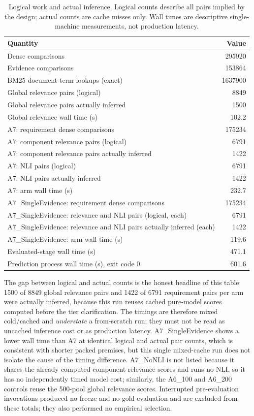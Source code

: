 \documentclass[11pt,a4paper]{article}
\begin{document}
\begin{table}[htbp]
\centering
\footnotesize
\caption{Logical work and actual inference. Logical counts describe all pairs implied by the design; actual counts are cache misses only. Wall times are descriptive single-machine measurements, not production latency.}
\label{tab:efficiency}
\begin{tabular}{@{}lr@{}}
\toprule
Quantity & Value \\
\midrule
Dense comparisons & 295920 \\
Evidence comparisons & 153864 \\
BM25 document-term lookups (exact) & 1637900 \\
Global relevance pairs (logical) & 8849 \\
Global relevance pairs actually inferred & 1500 \\
Global relevance wall time (s) & 102.2 \\
\midrule
A7: requirement dense comparisons & 175234 \\
A7: component relevance pairs (logical) & 6791 \\
A7: component relevance pairs actually inferred & 1422 \\
A7: NLI pairs (logical) & 6791 \\
A7: NLI pairs actually inferred & 1422 \\
A7: arm wall time (s) & 232.7 \\
\midrule
A7\_SingleEvidence: requirement dense comparisons & 175234 \\
A7\_SingleEvidence: relevance and NLI pairs (logical, each) & 6791 \\
A7\_SingleEvidence: relevance and NLI pairs actually inferred (each) & 1422 \\
A7\_SingleEvidence: arm wall time (s) & 119.6 \\
\midrule
Evaluated-stage wall time (s) & 471.1 \\
Prediction process wall time (s), exit code 0 & 601.6 \\
\bottomrule
\end{tabular}
\end{table}

The gap between logical and actual counts is the honest headline of this table: 1500 of 8849 global relevance pairs and 1422 of 6791 requirement pairs per arm were actually inferred, because this run reuses cached pure-model scores computed before the tier clarification. The timings are therefore mixed cold/cached and \emph{understate} a from-scratch run; they must not be read as uncached inference cost or as production latency. A7\_SingleEvidence shows a lower wall time than A7 at identical logical and actual pair counts, which is consistent with shorter packed premises, but this single mixed-cache run does not isolate the cause of the timing difference. A7\_NoNLI is not listed because it shares the already computed component relevance scores and runs no NLI, so it has no independently timed model cost; similarly, the A6\_100 and A6\_200 controls reuse the 500-pool global relevance scores. Interrupted pre-evaluation invocations produced no freeze and no gold evaluation and are excluded from these totals; they also performed no empirical selection.
\end{document}
